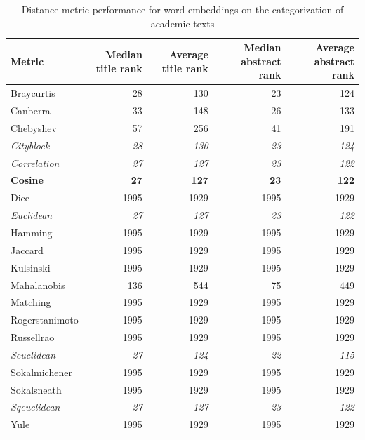 \documentclass[../../Thesis.tex]{subfiles}
\begin{document}
\begin{table}[hbt]
\begin{tabular}{|l|r|r|r|r|}
\hline
Metric\footnotemark & Median title rank & Average title rank & Median abstract rank & Average abstract rank  \\
\hline
Braycurtis & 28 & 130 & 23 & 124  \\
\hline
Canberra & 33 & 148 & 26 & 133  \\
\hline
Chebyshev & 57 & 256 & 41 & 191  \\
\hline
\textit{Cityblock} & \textit{28} & \textit{130} & \textit{23} & \textit{124}  \\
\hline
\textit{Correlation} & \textit{27} & \textit{127} & \textit{23} & \textit{122}  \\
\hline
\textbf{Cosine} & \textbf{27} & \textbf{127} & \textbf{23} & \textbf{122}  \\
\hline
Dice & 1995 & 1929 & 1995 & 1929  \\
\hline
\textit{Euclidean} & \textit{27} & \textit{127} & \textit{23} & \textit{122}  \\
\hline
Hamming & 1995 & 1929 & 1995 & 1929  \\
\hline
Jaccard & 1995 & 1929 & 1995 & 1929  \\
\hline
Kulsinski & 1995 & 1929 & 1995 & 1929  \\
\hline
Mahalanobis & 136 & 544 & 75 & 449  \\
\hline
Matching & 1995 & 1929 & 1995 & 1929  \\
\hline
Rogerstanimoto & 1995 & 1929 & 1995 & 1929  \\
\hline
Russellrao & 1995 & 1929 & 1995 & 1929  \\
\hline
\textit{Seuclidean} & \textit{27} & \textit{124} & \textit{22} & \textit{115}  \\
\hline
Sokalmichener & 1995 & 1929 & 1995 & 1929  \\
\hline
Sokalsneath & 1995 & 1929 & 1995 & 1929  \\
\hline
\textit{Sqeuclidean} & \textit{27} & \textit{127} & \textit{23} & \textit{122}  \\
\hline
Yule & 1995 & 1929 & 1995 & 1929  \\
\hline
\end{tabular}
\caption{Distance metric performance for word embeddings on the categorization of academic texts}\label{table:distanceMetrics}
\end{table}
\end{document}

